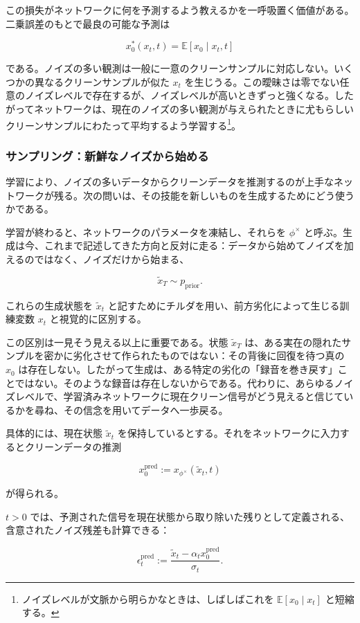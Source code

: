 この損失がネットワークに何を予測するよう教えるかを一呼吸置く価値がある。二乗誤差のもとで最良の可能な予測は

\[
x_0^*(x_t, t) = \mathbb{E}[x_0 \mid x_t, t]
\]


である。ノイズの多い観測は一般に一意のクリーンサンプルに対応しない。いくつかの異なるクリーンサンプルが似た $x_t$ を生じうる。この曖昧さは零でない任意のノイズレベルで存在するが、ノイズレベルが高いときずっと強くなる。したがってネットワークは、現在のノイズの多い観測が与えられたときに尤もらしいクリーンサンプルにわたって平均するよう学習する\footnote{ノイズレベルが文脈から明らかなときは、しばしばこれを $\mathbb{E}[x_0 \mid x_t]$ と短縮する。}。


\subsubsection*{サンプリング：新鮮なノイズから始める}


学習により、ノイズの多いデータからクリーンデータを推測するのが上手なネットワークが残る。次の問いは、その技能を新しいものを生成するためにどう使うかである。

学習が終わると、ネットワークのパラメータを凍結し、それらを $\phi^\times$ と呼ぶ。生成は今、これまで記述してきた方向と反対に走る：データから始めてノイズを加えるのではなく、ノイズだけから始まる、

\[
\tilde{x}_T \sim p_{\mathrm{prior}}.
\]


これらの生成状態を $\tilde{x}_t$ と記すためにチルダを用い、前方劣化によって生じる訓練変数 $x_t$ と視覚的に区別する。

この区別は一見そう見える以上に重要である。状態 $\tilde{x}_T$ は、ある実在の隠れたサンプルを密かに劣化させて作られたものではない：その背後に回復を待つ真の $x_0$ は存在しない。したがって生成は、ある特定の劣化の「録音を巻き戻す」ことではない。そのような録音は存在しないからである。代わりに、あらゆるノイズレベルで、学習済みネットワークに現在クリーン信号がどう見えると信じているかを尋ね、その信念を用いてデータへ一歩戻る。

具体的には、現在状態 $\tilde{x}_t$ を保持しているとする。それをネットワークに入力するとクリーンデータの推測

\[
x_0^{\mathrm{pred}} := x_{\phi^\times}(\tilde{x}_t, t)
\]


が得られる。

$t > 0$ では、予測された信号を現在状態から取り除いた残りとして定義される、含意されたノイズ残差も計算できる：

\[
\epsilon_t^{\mathrm{pred}} := \frac{\tilde{x}_t - \alpha_t x_0^{\mathrm{pred}}}{\sigma_t}.
\]


